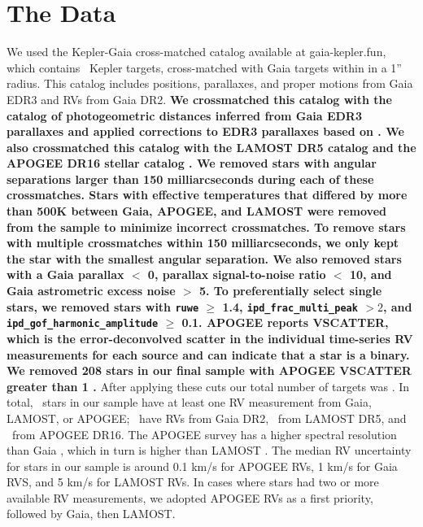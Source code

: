 \section{The Data}
\label{sec:data}

We used the Kepler-Gaia cross-matched catalog available at gaia-kepler.fun,
which contains \nfun\ Kepler targets, cross-matched with Gaia targets within
in a 1'' radius.
This catalog includes positions, parallaxes, and proper motions from
Gaia EDR3 and RVs from Gaia DR2.
{\bf We crossmatched this catalog with the catalog of photogeometric
distances inferred from Gaia EDR3 parallaxes \citep{bailer-jones2021} and
applied corrections to EDR3 parallaxes based on \citet{lindegren2021b}.
We also crossmatched this catalog with the LAMOST DR5 catalog and the APOGEE
DR16 stellar catalog \citep{cui2012, apogee_dr16, xiang2019}.
We removed stars with angular separations larger than 150 milliarcseconds
during each of these crossmatches.
Stars with effective temperatures that differed by more than 500K between
Gaia, APOGEE, and LAMOST were removed from the sample to minimize incorrect
crossmatches.
To remove stars with multiple crossmatches within 150 milliarcseconds, we only
kept the star with the smallest angular separation.
We also removed stars with a Gaia parallax $<$ 0, parallax signal-to-noise
ratio $<$ 10, and Gaia astrometric excess noise $>$ 5.
To preferentially select single stars, we removed stars with {\tt ruwe} $\geq$
1.4, {\tt ipd\_frac\_multi\_peak} $>2$, and {\tt
ipd\_gof\_harmonic\_amplitude} $\geq$ 0.1.
APOGEE reports VSCATTER, which is the error-deconvolved scatter in the
individual time-series RV measurements for each source and can indicate that a
star is a binary.
We removed 208 stars in our final sample with APOGEE VSCATTER greater than 1
\kms.}
After applying these cuts our total number of targets was \nstars.
In total, \nrv\ stars in our sample have at least one RV measurement from
Gaia, LAMOST, or APOGEE; \ngaia\ have RVs from Gaia DR2, \nlamost\ from LAMOST
DR5, and \napogee\ from APOGEE DR16.
The APOGEE survey \citep[R $=$ 22,500;][]{apogee} has a higher spectral
resolution than Gaia \citep[R $=$ 11,500;][]{cropper2018}, which in turn is
higher than LAMOST \citep[R $=$ 1,800;][]{zhao2012}.
The median RV uncertainty for stars in our sample is around 0.1 km/s for
APOGEE RVs, 1 km/s for Gaia RVS, and 5 km/s for
LAMOST RVs.
In cases where stars had two or more available RV measurements, we adopted
APOGEE RVs as a first priority, followed by Gaia, then LAMOST.

